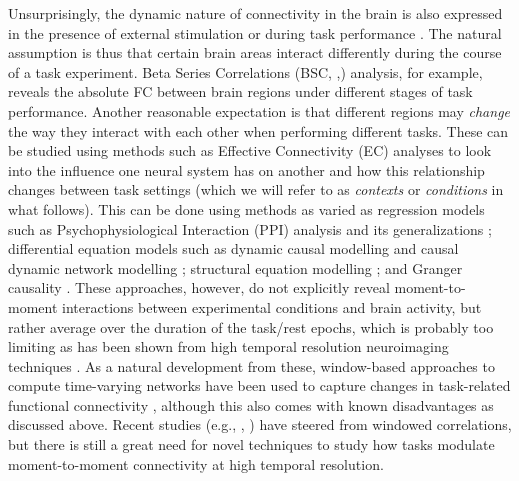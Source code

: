 Unsurprisingly, the dynamic nature of connectivity in the brain is also expressed in the presence of external stimulation or during task performance \citep{Gonzalez-Castillo2018}. The natural assumption is thus that certain brain areas interact differently during the course of a task experiment. Beta Series Correlations (BSC, \citeauthor{Rissman2004},\citeyear{Rissman2004}) analysis, for example, reveals the absolute FC between brain regions under different stages of task performance. Another reasonable expectation is that different regions may \textit{change} the way they interact with each other when performing different tasks. These can be studied using methods such as Effective Connectivity (EC) analyses to look into the influence one neural system has on another and how this relationship changes between task settings (which we will refer to as \textit{contexts} or \textit{conditions} in what follows). This can be done using methods as varied as regression models such as Psychophysiological Interaction (PPI) analysis \citep{Friston1997} and its generalizations \citep{McLaren2012}; differential equation models such as dynamic causal modelling \citep{Friston2003} and causal dynamic network modelling \citep{Cao2019};  structural equation modelling \citep{Zhuang2008}; and Granger causality \citep{Wen2013}. These approaches, however, do not explicitly reveal moment-to-moment interactions between experimental conditions and brain activity, but rather average over the duration of the task/rest epochs, which is probably too limiting as has been shown from high temporal resolution neuroimaging techniques \citep{Ploner2009, Zhang2012}. As a natural development from these, window-based approaches to compute time-varying networks have been used to capture changes in task-related functional connectivity \citep{Di2015,Baczkowski2017, Ge2019}, although this also comes with known disadvantages as discussed above. Recent studies (e.g., \citeauthor{Fransson2018}, \citeyear{Fransson2018}) have steered from windowed correlations, but there is still a great need for novel techniques to study how tasks modulate moment-to-moment connectivity at high temporal resolution.


